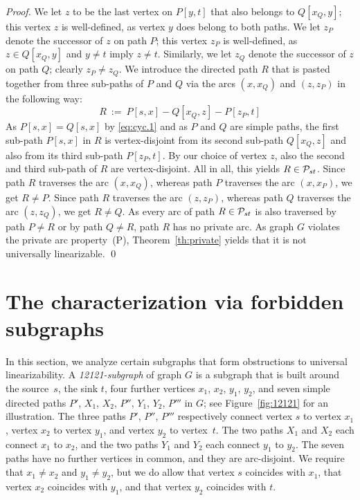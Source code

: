 \documentclass[runningheads]{llncs}
\begin{document}
\begin{proof}
We let $z$ to be the last vertex on $P[y,t]$ that also belongs to $Q[x_Q,y]$;
this vertex $z$ is well-defined, as vertex $y$ does belong to both paths.
We let $z_P$ denote the successor of $z$ on path $P$; this vertex $z_P$ is well-defined, as 
$z\in Q[x_Q,y]$ and $y\ne t$ imply $z\ne t$.
Similarly, we let $z_Q$ denote the successor of $z$ on path $Q$; clearly $z_P\ne z_Q$.
We introduce the directed path $R$ that is pasted together from three sub-paths of $P$ and $Q$ 
via the arcs $(x,x_Q)$ and $(z,z_P)$ in the following way:
\begin{equation}
\label{eq:cyc.2}
R ~:=~ P[s,x] - Q[x_Q,z] - P[z_P,t] 
\end{equation}
As $P[s,x]=Q[s,x]$ by \eqref{eq:cyc.1} and as $P$ and $Q$ are simple paths, the first 
sub-path $P[s,x]$ in $R$ is vertex-disjoint from its second sub-path $Q[x_Q,z]$ and 
also from its third sub-path $P[z_P,t]$.
By our choice of vertex $z$, also the second and third sub-path of $R$ are vertex-disjoint.
All in all, this yields $R\in{\cal P}_{st}$.
Since path $R$ traverses the arc $(x,x_Q)$, whereas path $P$ traverses the arc $(x,x_P)$, we get $R\ne P$.
Since path $R$ traverses the arc $(z,z_P)$, whereas path $Q$ traverses the arc $(z,z_Q)$, we get $R\ne Q$.
As every arc of path $R\in{\cal P}_{st}$ is also traversed by path $P\ne R$ or by path $Q\ne R$, 
path $R$ has no private arc.
As graph $G$ violates the private arc property~(P), Theorem~\ref{th:private} yields that it 
is not universally linearizable.
\qed
\end{proof}


\section{The characterization via forbidden subgraphs}
\label{sec:forbidden}
In this section, we analyze certain subgraphs that form obstructions to universal linearizability.
A \emph{12121-subgraph} of graph $G$ is a subgraph that is built around the source~$s$, the sink $t$, 
four further vertices $x_1$, $x_2$, $y_1$, $y_2$, and seven simple directed paths $P'$, $X_1$, 
$X_2$, $P''$, $Y_1$, $Y_2$, $P'''$ in $G$; see Figure~\ref{fig:12121} for an illustration.
The three paths $P'$, $P''$, $P'''$ respectively connect vertex $s$ to vertex $x_1$,
vertex $x_2$ to vertex $y_1$, and vertex $y_2$ to vertex~$t$.
The two paths $X_1$ and $X_2$ each connect $x_1$ to $x_2$, and
the two paths $Y_1$ and $Y_2$ each connect $y_1$ to $y_2$.
The seven paths have no further vertices in common, and they are arc-disjoint.
We require that $x_1\ne x_2$ and $y_1\ne y_2$, but we do allow that vertex $s$ coincides with $x_1$, 
that vertex $x_2$ coincides with $y_1$, and that vertex $y_2$ coincides with $t$. 
\end{document}
